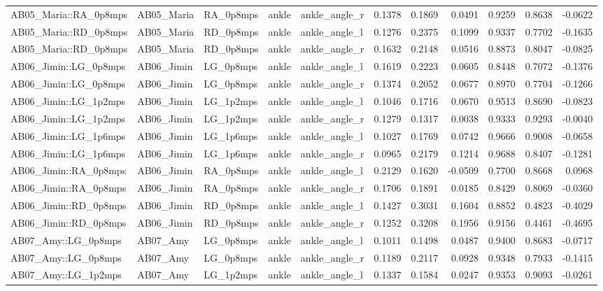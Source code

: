 \begin{table}
\begin{tabular}{lllllrrrrrr}
AB05_Maria::RA_0p8mps & AB05_Maria & RA_0p8mps & ankle & ankle_angle_r & 0.1378 & 0.1869 & 0.0491 & 0.9259 & 0.8638 & -0.0622 \\
AB05_Maria::RD_0p8mps & AB05_Maria & RD_0p8mps & ankle & ankle_angle_l & 0.1276 & 0.2375 & 0.1099 & 0.9337 & 0.7702 & -0.1635 \\
AB05_Maria::RD_0p8mps & AB05_Maria & RD_0p8mps & ankle & ankle_angle_r & 0.1632 & 0.2148 & 0.0516 & 0.8873 & 0.8047 & -0.0825 \\
AB06_Jimin::LG_0p8mps & AB06_Jimin & LG_0p8mps & ankle & ankle_angle_l & 0.1619 & 0.2223 & 0.0605 & 0.8448 & 0.7072 & -0.1376 \\
AB06_Jimin::LG_0p8mps & AB06_Jimin & LG_0p8mps & ankle & ankle_angle_r & 0.1374 & 0.2052 & 0.0677 & 0.8970 & 0.7704 & -0.1266 \\
AB06_Jimin::LG_1p2mps & AB06_Jimin & LG_1p2mps & ankle & ankle_angle_l & 0.1046 & 0.1716 & 0.0670 & 0.9513 & 0.8690 & -0.0823 \\
AB06_Jimin::LG_1p2mps & AB06_Jimin & LG_1p2mps & ankle & ankle_angle_r & 0.1279 & 0.1317 & 0.0038 & 0.9333 & 0.9293 & -0.0040 \\
AB06_Jimin::LG_1p6mps & AB06_Jimin & LG_1p6mps & ankle & ankle_angle_l & 0.1027 & 0.1769 & 0.0742 & 0.9666 & 0.9008 & -0.0658 \\
AB06_Jimin::LG_1p6mps & AB06_Jimin & LG_1p6mps & ankle & ankle_angle_r & 0.0965 & 0.2179 & 0.1214 & 0.9688 & 0.8407 & -0.1281 \\
AB06_Jimin::RA_0p8mps & AB06_Jimin & RA_0p8mps & ankle & ankle_angle_l & 0.2129 & 0.1620 & -0.0509 & 0.7700 & 0.8668 & 0.0968 \\
AB06_Jimin::RA_0p8mps & AB06_Jimin & RA_0p8mps & ankle & ankle_angle_r & 0.1706 & 0.1891 & 0.0185 & 0.8429 & 0.8069 & -0.0360 \\
AB06_Jimin::RD_0p8mps & AB06_Jimin & RD_0p8mps & ankle & ankle_angle_l & 0.1427 & 0.3031 & 0.1604 & 0.8852 & 0.4823 & -0.4029 \\
AB06_Jimin::RD_0p8mps & AB06_Jimin & RD_0p8mps & ankle & ankle_angle_r & 0.1252 & 0.3208 & 0.1956 & 0.9156 & 0.4461 & -0.4695 \\
AB07_Amy::LG_0p8mps & AB07_Amy & LG_0p8mps & ankle & ankle_angle_l & 0.1011 & 0.1498 & 0.0487 & 0.9400 & 0.8683 & -0.0717 \\
AB07_Amy::LG_0p8mps & AB07_Amy & LG_0p8mps & ankle & ankle_angle_r & 0.1189 & 0.2117 & 0.0928 & 0.9348 & 0.7933 & -0.1415 \\
AB07_Amy::LG_1p2mps & AB07_Amy & LG_1p2mps & ankle & ankle_angle_l & 0.1337 & 0.1584 & 0.0247 & 0.9353 & 0.9093 & -0.0261 \\

\end{tabular}
\end{table}
